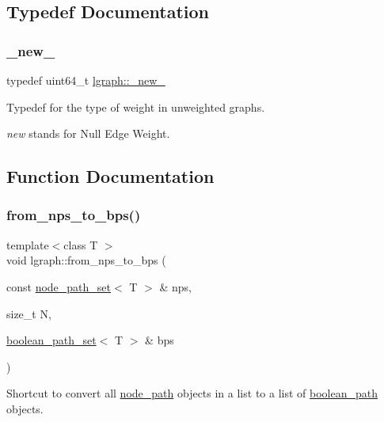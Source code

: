 \subsection{Typedef Documentation}
\mbox{\label{namespacelgraph_aa930092705699c3af78e3a4de7880a3f}} 
\subsubsection{\texorpdfstring{\+\_\+new\+\_\+}{\_new\_}}
{\footnotesize\ttfamily typedef uint64\+\_\+t \hyperlink{namespacelgraph_aa930092705699c3af78e3a4de7880a3f}{lgraph\+::\+\_\+new\+\_\+}}



Typedef for the type of weight in unweighted graphs. 

{\itshape new} stands for Null Edge Weight. 

\subsection{Function Documentation}
\mbox{\label{namespacelgraph_a22faf23dc44c909b5727c26625637447}} 
\subsubsection{\texorpdfstring{from\+\_\+nps\+\_\+to\+\_\+bps()}{from\_nps\_to\_bps()}}
{\footnotesize\ttfamily template$<$class T $>$ \\
void lgraph\+::from\+\_\+nps\+\_\+to\+\_\+bps (\begin{DoxyParamCaption}\item[{const \hyperlink{namespacelgraph_a0570ce57129123d5816913d287f6cc73}{node\+\_\+path\+\_\+set}$<$ T $>$ \&}]{nps,  }\item[{size\+\_\+t}]{N,  }\item[{\hyperlink{namespacelgraph_afad432931ba600ab1628d5c9595986c5}{boolean\+\_\+path\+\_\+set}$<$ T $>$ \&}]{bps }\end{DoxyParamCaption})}



Shortcut to convert all \hyperlink{classlgraph_1_1node__path}{node\+\_\+path} objects in a list to a list of \hyperlink{classlgraph_1_1boolean__path}{boolean\+\_\+path} objects. 


